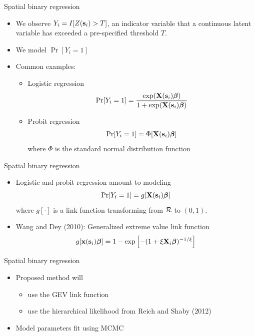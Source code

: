 \documentclass{beamer}
\begin{document}
\begin{frame}{Spatial binary regression}
  \begin{itemize} \setlength{\itemsep}{0.5em}
    \item We observe $Y_i = I[Z(\mbox{\bf s}_i) > T]$, an indicator variable that a continuous latent variable has exceeded a pre-specified threshold $T$.
    \item We model $\Pr[Y_i = 1]$
    \item Common examples:
    \begin{itemize}
      \item Logistic regression
      \begin{align*}
        \Pr[Y_i = 1] = \frac{ \exp(\mbox{\bf X}(\mbox{\bf s}_i) \mbox{\boldmath $\beta$}) }{ 1 + \exp(\mbox{\bf X}(\mbox{\bf s}_i) \mbox{\boldmath $\beta$})}
      \end{align*}
      \item Probit regression
      \begin{align*}
        \Pr[Y_i = 1] = \Phi[\mbox{\bf X}(\mbox{\bf s}_i) \mbox{\boldmath $\beta$}]
      \end{align*}
      where $\Phi$ is the standard normal distribution function
    \end{itemize}
  \end{itemize}
\end{frame}

\begin{frame}{Spatial binary regression}
  \begin{itemize} \setlength{\itemsep}{0.5em}
    \item Logistic and probit regression amount to modeling
    \begin{align*}
      \Pr[Y_i = 1] = g[\mbox{\bf X}(\mbox{\bf s}_i) \mbox{\boldmath $\beta$}]
    \end{align*}
    where $g[\cdot]$ is a link function transforming from ${\cal R}$ to $(0, 1)$.
    \item Wang and Dey (2010): Generalized extreme value link function
    \begin{align*}
      g[\mbox{\bf x}(\mbox{\bf s}_i) \mbox{\boldmath $\beta$}] = 1 - \exp\left[-(1 + \xi \mbox{\bf X}_i \mbox{\boldmath $\beta$})^{-1 / \xi} \right]
    \end{align*}
  \end{itemize}
\end{frame}

\begin{frame}{Spatial binary regression}
  \begin{itemize} \setlength{\itemsep}{0.5em}
    \item Proposed method will
    \begin{itemize}
      \item use the GEV link function
      \item use the hierarchical likelihood from Reich and Shaby (2012)
    \end{itemize}
    \item Model parameters fit using MCMC
  \end{itemize}
\end{frame}
\end{document}
